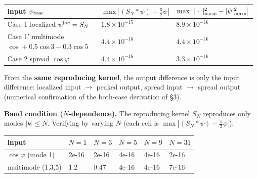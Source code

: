 \documentclass[
]{ltjsarticle}
\newcounter{none} %
\begin{document}
{\def\LTcaptype{none} %
\begin{longtable}[]{@{}
  >{\raggedright\arraybackslash}p{}
  >{\raggedright\arraybackslash}p{}
  >{\raggedright\arraybackslash}p{}@{}}
\toprule\noalign{}
\begin{minipage}[b]{\linewidth}\raggedright
input \(\psi_{\rm base}\)
\end{minipage} & \begin{minipage}[b]{\linewidth}\raggedright
\(\max|(S_N*\psi)-\tfrac{\pi}{2}\psi|\)
\end{minipage} & \begin{minipage}[b]{\linewidth}\raggedright
\(\max\big||\,\cdot\,|^2_{\rm norm}-|\psi|^2_{\rm norm}\big|\)
\end{minipage} \\
\midrule\noalign{}
\endhead
\bottomrule\noalign{}
\endlastfoot
Case 1 localized \(\psi^{\rm loc}=S_N\) & \(1.8\times10^{-15}\) &
\(8.9\times10^{-16}\) \\
Case 1' multimode \(\cos+0.5\cos3-0.3\cos5\) & \(4.4\times10^{-16}\) &
\(4.4\times10^{-16}\) \\
Case 2 spread \(\cos\varphi\) & \(4.4\times10^{-16}\) &
\(3.3\times10^{-16}\) \\
\end{longtable}
}

From the \textbf{same reproducing kernel}, the output difference is only
the input difference: localized input \(\to\) peaked output, spread
input \(\to\) spread output (numerical confirmation of the both-case
derivation of §3).

\textbf{Band condition (\(N\)-dependence).} The reproducing kernel
\(S_N\) reproduces only modes \(|k|\le N\). Verifying by varying \(N\)
(each cell is \(\max|(S_N*\psi)-\tfrac{\pi}{2}\psi|\)):

{\def\LTcaptype{none} %
\begin{longtable}[]{@{}llllll@{}}
\toprule\noalign{}
input & \(N=1\) & \(N=3\) & \(N=5\) & \(N=9\) & \(N=31\) \\
\midrule\noalign{}
\endhead
\bottomrule\noalign{}
\endlastfoot
\(\cos\varphi\) (mode 1) & 2e-16 & 2e-16 & 4e-16 & 4e-16 & 2e-16 \\
multimode (1,3,5) & 1.2 & 0.47 & 4e-16 & 4e-16 & 7e-16 \\
\end{longtable}
}
\end{document}
